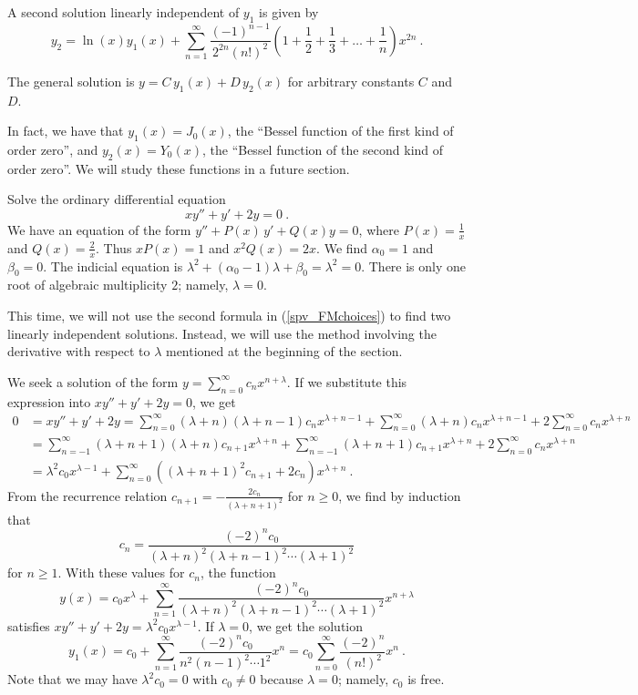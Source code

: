 \begin{egg}
A second solution linearly independent of $y_1$ is given by
\[
y_2 = \ln(x) y_1(x) + \sum_{n=1}^\infty 
\frac{(-1)^{n-1}}{2^{2n}(n!)^2}\left(1+\frac{1}{2}
  +\frac{1}{3} + \ldots + \frac{1}{n}\right) x^{2n}  \ .
\]

The general solution is
$\displaystyle y = C\, y_1(x) + D\, y_2(x)$ for arbitrary constants
$C$ and $D$.

In fact, we have that $y_1(x) = J_0(x)$, the ``Bessel function of
the first kind of order zero'', and $y_2(x) = Y_0(x)$, the ``Bessel
function of the second kind of order zero''.  We will study these
functions in a future section.
\end{egg}

\begin{egg}
Solve the ordinary differential equation
\[
xy''+  y' + 2 y = 0 \ .
\]
We have an equation of the form
$\displaystyle y'' + P(x)\, y' + Q(x) y = 0$, where
$\displaystyle P(x) = \frac{1}{x}$ and
$\displaystyle Q(x) = \frac{2}{x}$.
Thus $\displaystyle x P(x) = 1$ and
$\displaystyle x^2 Q(x) = 2x$.  We find
$\alpha_0 = 1$ and $\beta_0= 0$.  The indicial equation is
$\displaystyle \lambda^2 + (\alpha_0 - 1)\lambda + \beta_0 = \lambda^2 = 0$.
There is only one root of algebraic multiplicity $2$; namely, $\lambda=0$.

This time, we will not use the second formula in (\ref{spv_FMchoices})
to find two linearly independent solutions.  Instead, we will use the
method involving the derivative with respect to $\lambda$ mentioned at
the beginning of the section.

We seek a solution of the form
$\displaystyle y = \sum_{n=0}^\infty c_n x^{n+\lambda}$.
If we substitute this expression into
$\displaystyle xy''+ y' + 2y = 0$, we get
\begin{align*}
0 & = xy''+ y' + 2y
= \sum_{n=0}^\infty (\lambda +n)(\lambda + n-1) c_n x^{\lambda + n-1}
+ \sum_{n=0}^\infty (\lambda +n) c_n x^{\lambda + n-1}
+ 2\sum_{n=0}^\infty c_n x^{\lambda + n} \\
&= \sum_{n=-1}^\infty (\lambda +n+1)(\lambda +n) c_{n+1} x^{\lambda +n}
+ \sum_{n=-1}^\infty (\lambda +n+1)c_{n+1} x^{\lambda +n}
+ 2\sum_{n=0}^\infty c_n x^{\lambda +n} \\
&= \lambda^2 c_0 x^{\lambda -1}
+ \sum_{n=0}^\infty \left( (\lambda +n+1)^2 c_{n+1} +
2c_n\right) x^{\lambda +n} \ .
\end{align*}
From the recurrence relation
$\displaystyle c_{n+1} = - \frac{2c_n}{(\lambda +n+1)^2}$
for $n \geq 0$, we find by induction that
\[
c_n = \frac{(-2)^n c_0}
{(\lambda +n)^2(\lambda +n-1)^2\cdots (\lambda + 1)^2}
\]
for $n \geq 1$. With these values for $c_n$, the function
\[
y(x) = c_0 x^\lambda + \sum_{n=1}^\infty 
\frac{(-2)^n c_0} {(\lambda +n)^2(\lambda +n-1)^2\cdots (\lambda + 1)^2}
x^{n+\lambda}
\]
satisfies $xy''+ y' + 2y = \lambda^2 c_0 x^{\lambda -1}$.
If $\lambda = 0$, we get the solution
\[
y_1(x) = c_0 + \sum_{n=1}^\infty
\frac{(-2)^n c_0} {n^2 (n-1)^2 \cdots 1^2}x^n
= c_0 \sum_{n=0}^\infty \frac{(-2)^n} {(n!)^2} x^n \  .
\]
Note that we may have $\displaystyle \lambda^2 c_0 = 0$ with $c_0 \neq 0$
because $\lambda =0$; namely, $c_0$ is free.


\end{egg}

